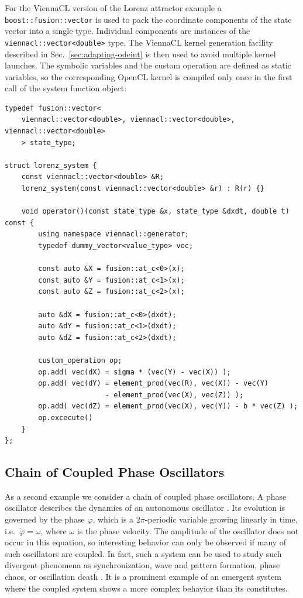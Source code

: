 \documentclass[final]{siamltex}
\newcommand{\code}[1]{\lstinline$#1$}
\begin{document}
For the ViennaCL version of the Lorenz attractor example a
\code{boost::fusion::vector} is used to pack the coordinate components of the
state vector into a single type. Individual components are instances of the
\code{viennacl::vector<double>} type.  The ViennaCL kernel generation facility described in
Sec.~\ref{sec:adapting-odeint} is then used to avoid multiple kernel launches.
The symbolic variables and the custom operation
are defined as static variables, so the corresponding OpenCL kernel is compiled
only once in the first call of the system function object:
\begin{lstlisting}
typedef fusion::vector<
    viennacl::vector<double>, viennacl::vector<double>, viennacl::vector<double>
    > state_type;

struct lorenz_system {
    const viennacl::vector<double> &R;
    lorenz_system(const viennacl::vector<double> &r) : R(r) {}

    void operator()(const state_type &x, state_type &dxdt, double t) const {
        using namespace viennacl::generator;
        typedef dummy_vector<value_type> vec;

        const auto &X = fusion::at_c<0>(x);
        const auto &Y = fusion::at_c<1>(x);
        const auto &Z = fusion::at_c<2>(x);

        auto &dX = fusion::at_c<0>(dxdt);
        auto &dY = fusion::at_c<1>(dxdt);
        auto &dZ = fusion::at_c<2>(dxdt);

        custom_operation op;
        op.add( vec(dX) = sigma * (vec(Y) - vec(X)) );
        op.add( vec(dY) = element_prod(vec(R), vec(X)) - vec(Y)
                        - element_prod(vec(X), vec(Z)) );
        op.add( vec(dZ) = element_prod(vec(X), vec(Y)) - b * vec(Z) );
        op.excecute()
    }
};
\end{lstlisting}



%
%
\subsection{Chain of Coupled Phase Oscillators}

As a second example we consider a chain of coupled phase
oscillators. A phase oscillator describes the dynamics of an
autonomous oscillator \cite{PhaseOscillator}. Its evolution is
governed by the phase $\varphi$, which is a $2\pi$-periodic variable growing linearly
in time, i.e.~$\dot{\varphi} = \omega$, where $\omega$ is the phase
velocity. The amplitude of the oscillator does not occur in this
equation, so interesting behavior can only be observed if many
of such oscillators are coupled. In fact, such a system can be used to
study such divergent phenomena as synchronization, wave and pattern
formation, phase chaos, or oscillation death
\cite{Kuramoto-84,Synchronization-Pikovsky}. It is a prominent example
of an emergent system where the coupled system shows a more complex
behavior than its constitutes.
\end{document}
